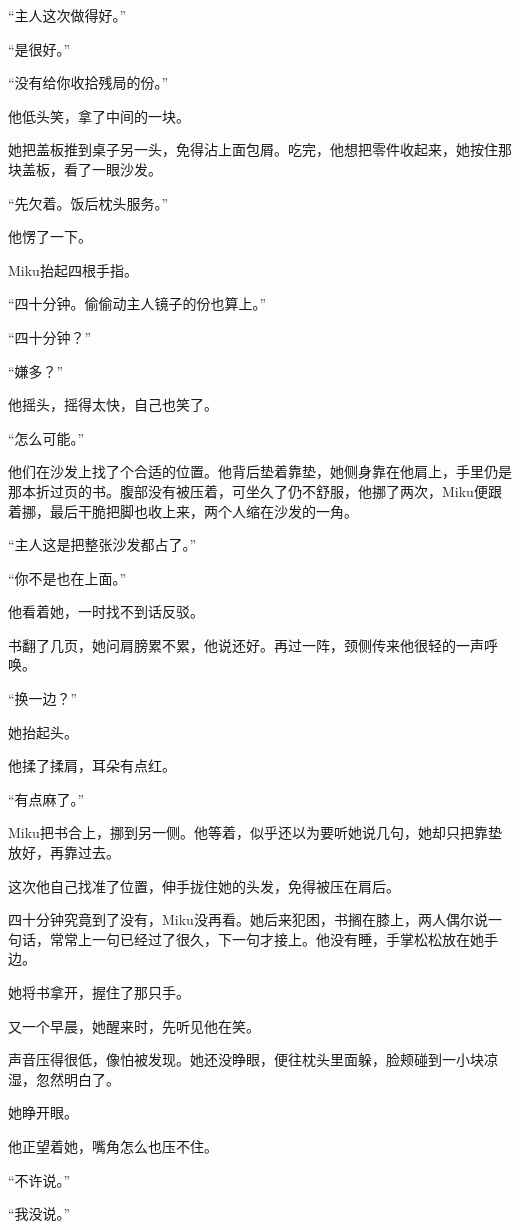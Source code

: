 “主人这次做得好。”

“是很好。”

“没有给你收拾残局的份。”

他低头笑，拿了中间的一块。

她把盖板推到桌子另一头，免得沾上面包屑。吃完，他想把零件收起来，她按住那块盖板，看了一眼沙发。

“先欠着。饭后枕头服务。”

他愣了一下。

Miku抬起四根手指。

“四十分钟。偷偷动主人镜子的份也算上。”

“四十分钟？”

“嫌多？”

他摇头，摇得太快，自己也笑了。

“怎么可能。”

他们在沙发上找了个合适的位置。他背后垫着靠垫，她侧身靠在他肩上，手里仍是那本折过页的书。腹部没有被压着，可坐久了仍不舒服，他挪了两次，Miku便跟着挪，最后干脆把脚也收上来，两个人缩在沙发的一角。

“主人这是把整张沙发都占了。”

“你不是也在上面。”

他看着她，一时找不到话反驳。

书翻了几页，她问肩膀累不累，他说还好。再过一阵，颈侧传来他很轻的一声呼唤。

“换一边？”

她抬起头。

他揉了揉肩，耳朵有点红。

“有点麻了。”

Miku把书合上，挪到另一侧。他等着，似乎还以为要听她说几句，她却只把靠垫放好，再靠过去。

这次他自己找准了位置，伸手拢住她的头发，免得被压在肩后。

四十分钟究竟到了没有，Miku没再看。她后来犯困，书搁在膝上，两人偶尔说一句话，常常上一句已经过了很久，下一句才接上。他没有睡，手掌松松放在她手边。

她将书拿开，握住了那只手。

\SceneBreak

又一个早晨，她醒来时，先听见他在笑。

声音压得很低，像怕被发现。她还没睁眼，便往枕头里面躲，脸颊碰到一小块凉湿，忽然明白了。

她睁开眼。

他正望着她，嘴角怎么也压不住。

“不许说。”

“我没说。”

